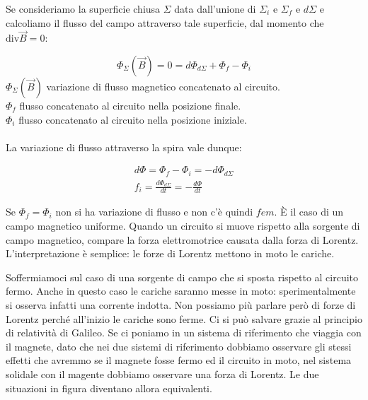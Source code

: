 \begin{figure}[htpb]
\end{figure}
\FloatBarrier

Se consideriamo la superficie chiusa $\Sigma$ data dall'unione di $ \Sigma_i  $ e $ \Sigma_f  $ e $ d\Sigma  $ e calcoliamo il flusso del campo attraverso tale superficie, dal momento che $ \text{div}\vec{B} =0 $:

\[
	\Phi_{\Sigma}(\vec{B}) = 0 = d\Phi_{d\Sigma} + \Phi_f - \Phi_i
\]
$\Phi_{\Sigma}(\vec{B})$ variazione di flusso magnetico concatenato al circuito.\\
$\Phi_f$ flusso concatenato al circuito nella posizione finale.\\
$\Phi_i$ flusso concatenato al circuito nella posizione iniziale.\\\\
La variazione di flusso attraverso la spira vale dunque:

\begin{gather*}
	d\Phi = \Phi_f-\Phi_i= -d\Phi_{d\Sigma} \\
	f_i = \frac{d\Phi_{d\Sigma}}{dt} = - \frac{d\Phi}{dt}
\end{gather*}

Se $ \Phi_f = \Phi_i $ non si ha variazione di flusso e non c'è quindi $fem$. È il caso di un campo magnetico uniforme.
Quando un circuito si muove rispetto alla sorgente di campo magnetico, compare la forza elettromotrice causata dalla forza di Lorentz. L'interpretazione è semplice: le forze di Lorentz mettono in moto le cariche.

Soffermiamoci sul caso di una sorgente di campo che si sposta rispetto al circuito fermo. Anche in questo caso le cariche saranno messe in moto: sperimentalmente si osserva infatti una corrente indotta. Non possiamo più parlare però di forze di Lorentz perché all'inizio le cariche sono ferme. Ci si può salvare grazie al principio di relatività di Galileo. Se ci poniamo in un sistema di riferimento che viaggia con il magnete, dato che nei due sistemi di riferimento dobbiamo osservare gli stessi effetti che avremmo se il magnete fosse fermo ed il circuito in moto, nel sistema solidale con il magente dobbiamo osservare una forza di Lorentz. Le due situazioni in figura diventano allora equivalenti.

